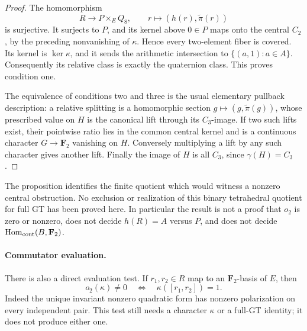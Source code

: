 \begin{proof}
The homomorphism
\[
 R\longrightarrow P\times_E Q_8,
 \qquad r\longmapsto(h(r),\widetilde\pi(r))
\]
is surjective.  It surjects to \(P\), and its kernel above
\(0\in P\) maps onto the central \(C_2\), by the preceding
nonvanishing of \(\kappa\).  Hence every two-element fiber is
covered.  Its kernel is \(\ker\kappa\), and it sends the
arithmetic intersection to \(\{(a,1):a\in A\}\).
Consequently its relative class is exactly the quaternion class.
This proves condition one.

The equivalence of conditions two and three is the usual elementary
pullback description: a relative splitting is a homomorphic section
\(g\mapsto(g,\widetilde\pi(g))\), whose prescribed value on
\(H\) is the canonical lift through its \(C_3\)-image.
If two such lifts exist, their pointwise ratio lies in the common
central kernel and is a continuous character \(G\to\mathbf F_2\)
vanishing on \(H\).  Conversely multiplying a lift by any such
character gives another lift.  Finally the image of \(H\) is all
\(C_3\), since \(\gamma(H)=C_3\).
\end{proof}

The proposition identifies the finite quotient which would witness
a nonzero central obstruction.  No exclusion or realization of this
binary tetrahedral quotient for full GT has been proved here.  In
particular the result is not a proof that \(o_2\) is zero or nonzero,
does not decide \(h(R)=A\) versus \(P\), and does not decide
\(\operatorname{Hom}_{\rm cont}(B,\mathbf F_2)\).

\paragraph{Commutator evaluation.}
There is also a direct evaluation test.  If \(r_1,r_2\in R\) map to
an \(\mathbf F_2\)-basis of \(E\), then
\[
 o_2(\kappa)\ne0
 \quad\Longleftrightarrow\quad
 \kappa([r_1,r_2])=1.
\]
Indeed the unique invariant nonzero quadratic form has nonzero
polarization on every independent pair.  This test still needs a
character \(\kappa\) or a full-GT identity; it does not
produce either one.
